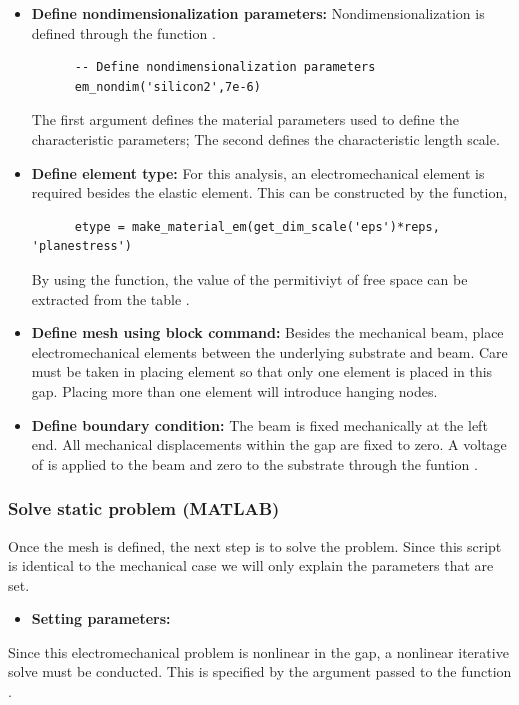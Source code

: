 \clearpage
\begin{itemize}

  \item{\textbf{Define nondimensionalization parameters:}}
  Nondimensionalization is defined through the function .
  \begin{verbatim}
      -- Define nondimensionalization parameters
      em_nondim('silicon2',7e-6)
  \end{verbatim}
  The first argument defines the material parameters used to define 
  the characteristic parameters; The second defines the characteristic 
  length scale.

  \item{\textbf{Define element type:}}
  For this analysis, an electromechanical element is required besides 
  the elastic element. This can be constructed by the function,
  \begin{verbatim}
      etype = make_material_em(get_dim_scale('eps')*reps, 'planestress')
  \end{verbatim}
  By using the  function, the value of the 
  permitiviyt of free space can be extracted from the table 
  . 

  \item{\textbf{Define mesh using block command:}}
  Besides the mechanical beam, place electromechanical elements between 
  the underlying substrate and beam. Care must be taken in placing element 
  so that only one element is
  placed in this gap. Placing more than one element will introduce 
  hanging nodes.

  \item{\textbf{Define boundary condition:}}
  The beam is fixed mechanically at the left end. All mechanical 
  displacements within the gap are fixed to zero. A voltage of  
  is applied to the beam and zero to the substrate through the 
  funtion .

\end{itemize}

\clearpage
\subsubsection*{Solve static problem (MATLAB)}
Once the mesh is defined, the next step is to solve the problem.
Since this script is identical to the mechanical case we will only
explain the parameters that are set.
\begin{itemize}

  \item{\textbf{Setting parameters:}}

\end{itemize}
Since this electromechanical problem is nonlinear in the gap, 
a nonlinear iterative solve must be conducted. This is specified by 
the argument passed to the function .

